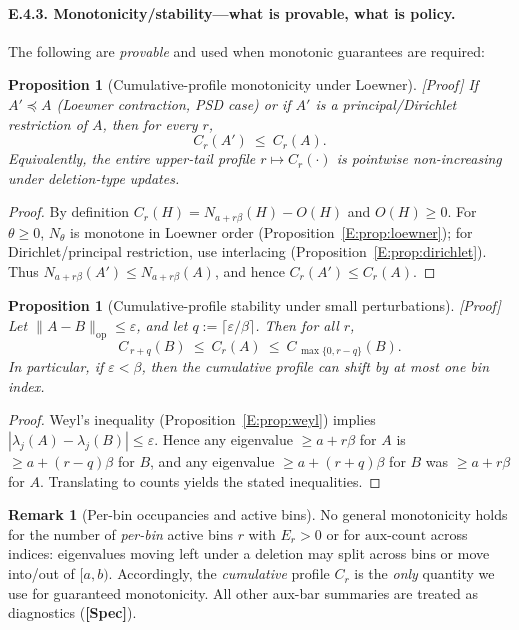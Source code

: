 \documentclass[11pt]{article}
\numberwithin{equation}{section}
\newtheorem{proposition}[theorem]{Proposition}
\theoremstyle{definition}
\newtheorem{remark}[theorem]{Remark}
\begin{document}
\paragraph{E.4.3. Monotonicity/stability—what is provable, what is policy.}
The following are \emph{provable} and used when monotonic guarantees are required:

\begin{proposition}[Cumulative-profile monotonicity under Loewner]\label{E:prop:aux-cum-mono}
\textup{[Proof]}
If \(A'\preceq A\) (Loewner contraction, PSD case) or if \(A'\) is a principal/Dirichlet restriction of \(A\), then for every \(r\),
\[
C_r(A')\ \le\ C_r(A).
\]
Equivalently, the entire upper-tail profile \(r\mapsto C_r(\cdot)\) is pointwise non-increasing under deletion-type updates.
\end{proposition}

\begin{proof}
By definition \(C_r(H)=N_{a+r\beta}(H)-O(H)\) and \(O(H)\ge 0\).
For \(\theta\ge 0\), \(N_\theta\) is monotone in Loewner order (Proposition~\ref{E:prop:loewner}); for Dirichlet/principal restriction, use interlacing (Proposition~\ref{E:prop:dirichlet}).
Thus \(N_{a+r\beta}(A')\le N_{a+r\beta}(A)\), and hence \(C_r(A')\le C_r(A)\).
\end{proof}

\begin{proposition}[Cumulative-profile stability under small perturbations]\label{E:prop:aux-cum-stab}
\textup{[Proof]}
Let \(\|A-B\|_{\mathrm{op}}\le \varepsilon\), and let \(q:=\lceil \varepsilon/\beta\rceil\).
Then for all \(r\),
\[
C_{\,r+q}(B)\ \le\ C_r(A)\ \le\ C_{\,\max\{0,r-q\}}(B).
\]
In particular, if \(\varepsilon<\beta\), then the cumulative profile can shift by at most one bin index.
\end{proposition}

\begin{proof}
Weyl’s inequality (Proposition~\ref{E:prop:weyl}) implies \(|\lambda_j(A)-\lambda_j(B)|\le \varepsilon\).
Hence any eigenvalue \(\ge a+r\beta\) for \(A\) is \(\ge a+(r-q)\beta\) for \(B\), and any eigenvalue \(\ge a+(r+q)\beta\) for \(B\) was \(\ge a+r\beta\) for \(A\).
Translating to counts yields the stated inequalities.
\end{proof}

\begin{remark}[Per-bin occupancies and active bins]
No general monotonicity holds for the number of \emph{per-bin} active bins \(r\) with \(E_r>0\) or for \(\mathrm{aux\text{-}count}\) across indices:
eigenvalues moving left under a deletion may split across bins or move into/out of \([a,b)\).
Accordingly, the \emph{cumulative} profile \(C_r\) is the \emph{only} quantity we use for guaranteed monotonicity.
All other aux-bar summaries are treated as diagnostics (\textbf{[Spec]}).
\end{remark}
\end{document}
